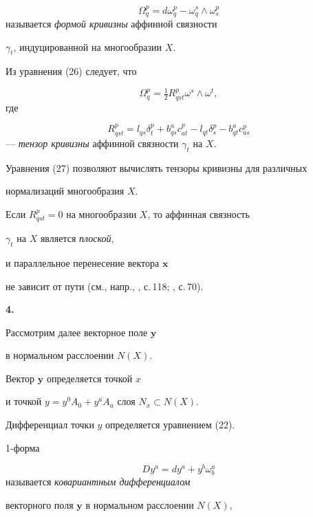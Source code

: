 $$


\Omega_q^p = d \omega_q^p - \omega_q^s \wedge \omega_s^p


$$
называется {\it формой кривизны} аффинной связности


$\gamma_t$, индуцированной на многообразии $X$.


Из уравнения (26) следует, что


$$


\Omega_q^p = \tfrac{1}{2} R^p_{qst} \omega^s \wedge \omega^t,


$$
где


\begin{equation}\label{eq:38}
R^p_{qst} = l_{qs} \delta_t^p + b^a_{qs} c_{at}^p - l_{qt}
\delta_s^p - b^a_{qt} c_{as}^p
\end{equation}
--- {\it тензор кривизны} аффинной связности $\gamma_t$ на $X$.


Уравнения (27) позволяют вычислять тензоры кривизны для различных


нормализаций многообразия $X$.



Если $R^p_{qst} = 0$ на многообразии $X$, то аффинная связность


$\gamma_t$ на $X$ является {\it плоской},


и параллельное перенесение вектора $\boldsymbol{x}$


не зависит от пути (см., напр., \cite{N76}, с.\,118; \cite{KN}, с.\,70).


\medskip





{\bf 4.}


Рассмотрим далее векторное поле $\boldsymbol{y}$


в нормальном расслоении $N (X)$.


Вектор $\boldsymbol{y}$ определяется точкой $x$


и точкой $y = y^0 A_0 + y^a A_a$ слоя $N_x \subset N (X)$.


Дифференциал точки $y$ определяется уравнением (22).





1-форма


$$


D y^a = dy^a + y^b \omega_b^a


$$
называется {\it ковариантным дифференциалом}


векторного поля $\boldsymbol{y}$ в нормальном расслоении $N (X)$,


